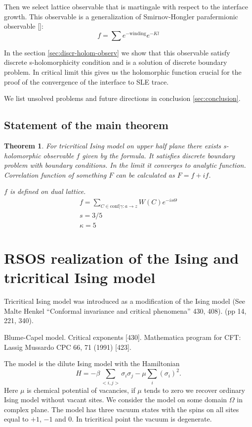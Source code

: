 \documentclass[12pt]{article}
\newtheorem{theorem}{Theorem}
\begin{document}
 Then we
select lattice observable that is martingale with respect to the interface growth.
This observable is a generalization of Smirnov-Hongler parafermionic observable []:
\begin{equation}
  \label{eq:3}
  f = \sum e^{-\mbox{winding}} e^{-Kl}
\end{equation}

In the section \ref{sec:discr-holom-observ} we show that this observable satisfy discrete s-holomorphicity
condition and is a solution of discrete boundary problem. In critical limit this gives us the
holomorphic function crucial for the proof of the convergence of the interface to SLE trace.

We list unsolved problems and future directions in conclusion \ref{sec:conclusion}.

\subsection{Statement of the main theorem}
\label{sec:results}

\begin{theorem}
  For tricritical Ising model on upper half plane there exists s-holomorphic observable $f$ given by the
  formula. It satisfies discrete boundary problem with boundary conditions. In the limit it
  converges to analytic function. Correlation function of something
  $F$ can be calculated as $F=f+if$.

  $f$ is defined on dual lattice. 
  \begin{eqnarray}
    \label{eq:17}
    f=\sum_{C\in \mbox{conf}|\gamma:a\to z} W(C) e^{-i s \Theta}\\
    s=3/5\\
    \kappa=5
  \end{eqnarray}
\end{theorem}
\section{RSOS realization of the Ising and tricritical Ising model}
\label{sec:rsos-real-ising}

Tricritical Ising model was introduced as a modification of the Ising
model \cite{} (See Malte Henkel ``Conformal invariance and critical
phenomena'' 430, 408). (pp 14, 221, 340).  

Blume-Capel model. Critical exponents [430]. Mathematica program for CFT: Lassig Mussardo CPC 66, 71 (1991) [423].

 The model is
the dilute Ising model with the Hamiltonian 
\begin{equation}
  \label{eq:1}
  H = -\beta \sum_{<i,j>}\sigma_i\sigma_j - \mu \sum_{i}(\sigma_i)^2.
\end{equation}
Here $\mu$ is chemical potential of vacancies,
if $\mu$ tends to zero we recover ordinary Ising model without vacant sites. We consider the model on some domain
$\Omega$ in complex plane. The model has three vacuum states with the spins on all sites equal to
$+1$, $-1$ and $0$. In tricritical point the vacuum is degenerate. 
\end{document}
